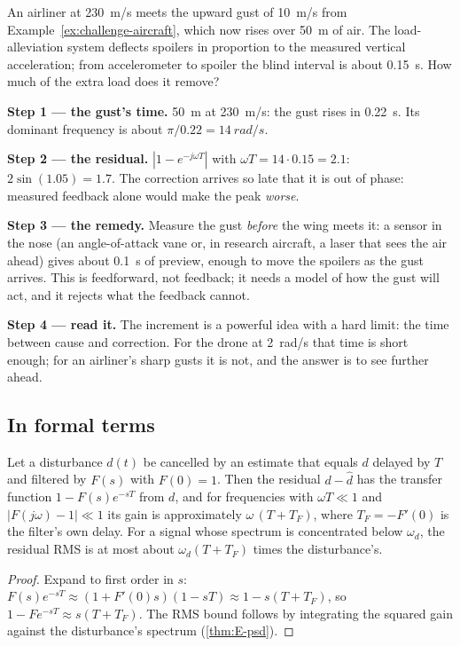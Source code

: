 \begin{example}
\label{ex:indiwind-aircraft}
An airliner at \SI{230}{m/s} meets the upward gust of \SI{10}{m/s} from Example~\ref{ex:challenge-aircraft}, which now rises over \SI{50}{m} of air. The load-alleviation system deflects spoilers in proportion to the measured vertical acceleration; from accelerometer to spoiler the blind interval is about \SI{0.15}{s}. How much of the extra load does it remove?

\textbf{Step 1 — the gust's time.} \SI{50}{m} at \SI{230}{m/s}: the gust rises in \SI{0.22}{s}. Its dominant frequency is about $\pi/0.22 = \SI{14}{rad/s}$.

\textbf{Step 2 — the residual.} $|1 - e^{-j\omega T}|$ with $\omega T = 14 \cdot 0.15 = 2.1$: $2\sin(1.05) = 1.7$. The correction arrives so late that it is out of phase: measured feedback alone would make the peak \emph{worse}.

\textbf{Step 3 — the remedy.} Measure the gust \emph{before} the wing meets it: a sensor in the nose (an angle-of-attack vane or, in research aircraft, a laser that sees the air ahead) gives about \SI{0.1}{s} of preview, enough to move the spoilers as the gust arrives. This is feedforward, not feedback; it needs a model of how the gust will act, and it rejects what the feedback cannot.

\textbf{Step 4 — read it.} The increment is a powerful idea with a hard limit: the time between cause and correction. For the drone at \SI{2}{rad/s} that time is short enough; for an airliner's sharp gusts it is not, and the answer is to see further ahead.
\end{example}

\subsection{In formal terms}

\begin{theorem}
\label{thm:indiwind-residual}
Let a disturbance $d(t)$ be cancelled by an estimate that equals $d$ delayed by $T$ and filtered by $F(s)$ with $F(0) = 1$. Then the residual $d - \hat d$ has the transfer function $1 - F(s)e^{-sT}$ from $d$, and for frequencies with $\omega T \ll 1$ and $|F(j\omega) - 1| \ll 1$ its gain is approximately $\omega\,(T + T_F)$, where $T_F = -F'(0)$ is the filter's own delay. For a signal whose spectrum is concentrated below $\omega_d$, the residual RMS is at most about $\omega_d(T + T_F)$ times the disturbance's.
\end{theorem}
\begin{proof}
Expand to first order in $s$: $F(s)e^{-sT} \approx (1 + F'(0)s)(1 - sT) \approx 1 - s(T + T_F)$, so $1 - Fe^{-sT} \approx s(T + T_F)$. The RMS bound follows by integrating the squared gain against the disturbance's spectrum (\cref{thm:E-psd}).
\end{proof}

